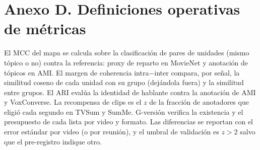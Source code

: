 \section*{Anexo D. Definiciones operativas de métricas}

El MCC del mapa se calcula sobre la clasificación de pares de unidades (mismo tópico o no)
contra la referencia: proxy de reparto en MovieNet y anotación de tópicos en AMI. El margen
de coherencia intra$-$inter compara, por señal, la similitud coseno de cada unidad con su
grupo (dejándola fuera) y la similitud entre grupos. El ARI evalúa la identidad de hablante
contra la anotación de AMI y VoxConverse. La recompensa de clips es el $z$ de la fracción de
anotadores que eligió cada segundo en TVSum y SumMe. G-versión verifica la existencia y el
presupuesto de cada lista por video y formato. Las diferencias se reportan con el error
estándar por video (o por reunión), y el umbral de validación es $z > 2$ salvo que el
pre-registro indique otro.
